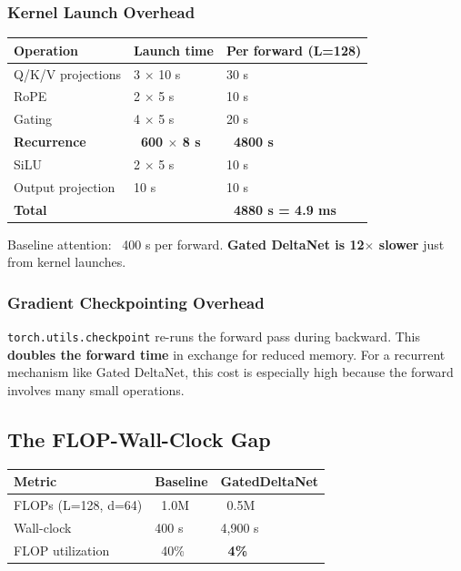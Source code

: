 \subsubsection{Kernel Launch Overhead}

\begin{table}[H]
\centering
\small
\begin{tabular}{lll}
\toprule
\textbf{Operation} & \textbf{Launch time} & \textbf{Per forward (L=128)} \\
\midrule
Q/K/V projections & 3 $\times$ 10  s & 30  s \\
RoPE & 2 $\times$ 5  s & 10  s \\
Gating & 4 $\times$ 5  s & 20  s \\
\textbf{Recurrence} & \textbf{~600 $\times$ 8  s} & \textbf{~4800  s} \\
SiLU & 2 $\times$ 5  s & 10  s \\
Output projection & 10  s & 10  s \\
\textbf{Total} &  & \textbf{~4880  s = 4.9 ms} \\
\bottomrule
\end{tabular}
\end{table}

Baseline attention: ~400  s per forward. \textbf{Gated DeltaNet is 12$\times$ slower} 
just from kernel launches.

\subsubsection{Gradient Checkpointing Overhead}

\texttt{torch.utils.checkpoint} re-runs the forward pass during backward. This 
\textbf{doubles the forward time} in exchange for reduced memory. For a 
recurrent mechanism like Gated DeltaNet, this cost is especially high 
because the forward involves many small operations.

\subsection{The FLOP-Wall-Clock Gap}

\begin{table}[H]
\centering
\small
\begin{tabular}{lll}
\toprule
\textbf{Metric} & \textbf{Baseline} & \textbf{GatedDeltaNet} \\
\midrule
FLOPs (L=128, d=64) & ~1.0M & ~0.5M \\
Wall-clock & 400  s & 4,900  s \\
FLOP utilization & ~40\% & \textbf{~4\%} \\
\bottomrule
\end{tabular}
\end{table}

